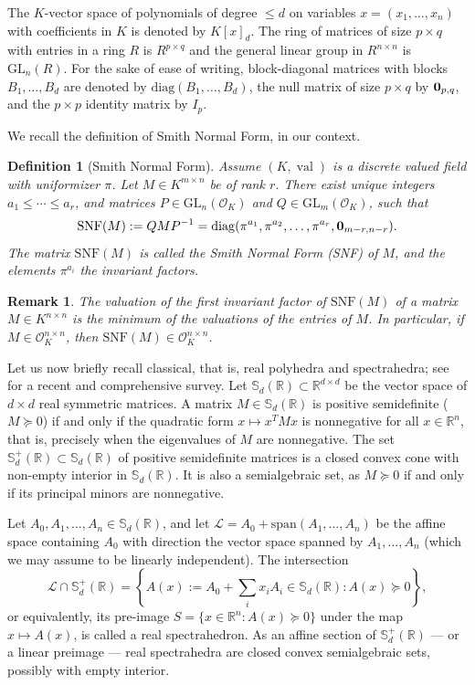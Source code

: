 \documentclass[sigconf]{acmart}
\newcommand{\R}{\mathbb{R}} %
\newcommand{\sym}{\mathbb{S}} %
\renewcommand{\span}[1]{{\mathrm{span}(#1)}} %
\newcommand{\calL}{\mathcal{L}} %
\newtheorem{definition}[theorem]{Definition}
\newtheorem{remark}[theorem]{Remark}
\DeclareMathOperator{\val}{val}
\newcommand{\OK}{\mathcal{O}_K}
\def\diag{\mathrm{diag}}
\newcommand{\GL}{\mathrm{GL}}
\begin{document}
The $K$-vector space of polynomials of degree $\leq d$ on variables
$x=(x_1,\ldots,x_n)$
with coefficients in $K$ is denoted by $K[x]_{d}$. The ring of matrices of
size $p \times q$ with entries in a ring $R$ is $R^{p \times q}$ and the general
linear group in $R^{n \times n}$ is $\GL_n(R)$.
For the sake of ease of writing, block-diagonal matrices with blocks
$B_1,\ldots,B_d$ are denoted by $\diag(B_1, \ldots, B_d)$, the null matrix of
size $p \times q$ by ${\bf 0}_{p,q}$, and the $p \times p$ identity matrix by $I_p$.

We recall the definition of Smith Normal Form, in our context.

\begin{definition}[Smith Normal Form]\label{smith_nf}
  Assume $(K,\val)$ is a discrete valued field with uniformizer $\pi$.
  Let $M \in K^{m \times n}$ be of rank $r$. There exist unique integers
  $a_1 \leq \cdots \leq a_r$, and
  matrices $P \in \GL_n(\OK)$ and $Q \in \GL_m(\OK)$, such that
  $$
  \mathrm{SNF}(M) := QMP^{-1} = \diag(\pi^{a_1}, \pi^{a_2}, \ldots, \pi^{a_r}, {\bf 0}_{m-r,n-r}).
  $$
  The matrix $\mathrm{SNF}(M)$ is called the \emph{Smith Normal Form (SNF)} of $M$, and the elements $\pi^{a_i}$ the
  \emph{invariant factors}.
\end{definition}
\begin{remark}
  The valuation of the first invariant factor of $\mathrm{SNF}(M)$ of a matrix
  $M \in K^{n \times n}$ is the minimum of the valuations of the entries of
  $M$. In particular, if $M \in \OK^{n \times n}$, then $\mathrm{SNF}(M) \in \OK^{n \times n}$.
\end{remark}

Let us now briefly recall classical, that is, real polyhedra and spectrahedra;
see \cite{netzer2023geometry} for a recent and comprehensive survey.
Let $\sym_d(\R) \subset \R^{d\times d}$ be the vector space of $d \times d$ real symmetric
matrices. A matrix $M \in \sym_d(\R)$ is {positive semidefinite} ($M \succeq 0$) if and only if
 the quadratic form $x \mapsto x^TMx$ is nonnegative for all $x\in \R^n$, that is, precisely when
  the eigenvalues of $M$ are nonnegative. The set $\sym_d^+(\R) \subset \sym_d(\R)$ of positive 
  semidefinite matrices is a closed convex cone with non-empty interior in $\sym_d(\R)$. 
  It is also a semialgebraic set, as $M \succeq 0$ if and only if its principal minors are nonnegative.

Let $A_0,A_1,\ldots,A_n \in \sym_d(\R)$, and let $\calL = A_0+\span{A_1,\ldots,A_n}$ be the affine space
containing $A_0$ with direction the vector space spanned by $A_1,\ldots,A_n$ (which we may assume
to be linearly independent). The intersection
$$
\calL \cap \sym_d^+(\R) = \left\{A(x) := A_0+\sum_i x_i A_i \in \sym_d(\R) :
A(x) \succeq 0\right\},
$$
or equivalently, its pre-image $S = \{x \in \R^n : A(x) \succeq 0\}$ under the map $x \mapsto A(x)$, is called
a {real spectrahedron}. As an affine section of $\sym_d^+(\R)$ --- or a linear preimage --- real spectrahedra
are closed convex semialgebraic sets, possibly with empty interior.
\end{document}

